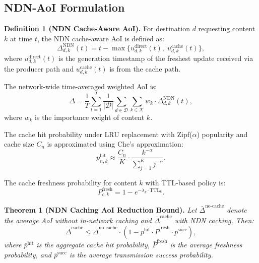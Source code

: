 \documentclass[journal]{IEEEtran}
\begin{document}
\subsection{NDN-AoI Formulation} \label{subsec:ndn_aoi}

\textbf{Definition 1 (NDN Cache-Aware AoI).} For destination $d$ requesting content $k$ at time $t$, the NDN cache-aware AoI is defined as:
\begin{equation} \label{eq:aoi_ndn}
\Delta_{d,k}^{\text{NDN}}(t) = t - \max\{u_{d,k}^{\text{direct}}(t),\; u_{d,k}^{\text{cache}}(t)\},
\end{equation}
where $u_{d,k}^{\text{direct}}(t)$ is the generation timestamp of the freshest update received via the producer path and $u_{d,k}^{\text{cache}}(t)$ is from the cache path.

The network-wide time-averaged weighted AoI is:
\begin{equation} \label{eq:avg_aoi}
\bar{\Delta} = \frac{1}{T} \sum_{t=1}^{T} \frac{1}{|\mathcal{D}|} \sum_{d \in \mathcal{D}} \sum_{k \in \mathcal{K}} w_k \cdot \Delta_{d,k}^{\text{NDN}}(t),
\end{equation}
where $w_k$ is the importance weight of content $k$.

The cache hit probability under LRU replacement with Zipf($\alpha$) popularity and cache size $C_n$ is approximated using Che's approximation:
\begin{equation} \label{eq:cache_hit}
p_{n,k}^{\text{hit}} \approx \frac{C_n}{K} \cdot \frac{k^{-\alpha}}{\sum_{j=1}^{K} j^{-\alpha}}.
\end{equation}

The cache freshness probability for content $k$ with TTL-based policy is:
\begin{equation} \label{eq:freshness}
P_{c,k}^{\text{fresh}} = 1 - e^{-\lambda_k \cdot \text{TTL}_k}.
\end{equation}

\textbf{Theorem 1 (NDN Caching AoI Reduction Bound).} \emph{Let $\bar{\Delta}^{\text{no-cache}}$ denote the average AoI without in-network caching and $\bar{\Delta}^{\text{cache}}$ with NDN caching. Then:}
\begin{equation} \label{eq:theorem1}
\bar{\Delta}^{\text{cache}} \leq \bar{\Delta}^{\text{no-cache}} \cdot \left(1 - \bar{p}^{\text{hit}} \cdot \bar{P}^{\text{fresh}} \cdot \bar{p}^{\text{succ}}\right),
\end{equation}
\emph{where $\bar{p}^{\text{hit}}$ is the aggregate cache hit probability, $\bar{P}^{\text{fresh}}$ is the average freshness probability, and $\bar{p}^{\text{succ}}$ is the average transmission success probability.}
\end{document}

